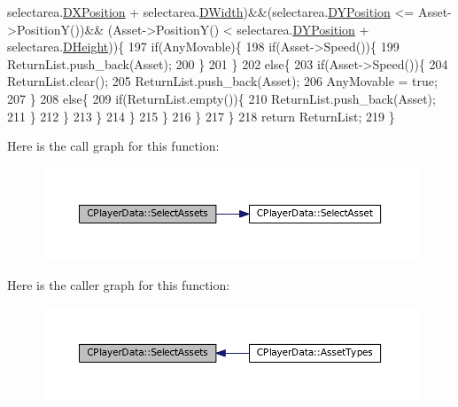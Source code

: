 \begin{DoxyCode}
      selectarea.\hyperlink{structSRectangle_abcbddb03b3ee416cc33109833b5f075c}{DXPosition} + selectarea.\hyperlink{structSRectangle_a4150898b3f7d90f6e4b0d44bf1ae3bd2}{DWidth})&&(selectarea.\hyperlink{structSRectangle_a120aa0a90033bc6e07c36c151a3bbc71}{DYPosition} <= Asset->PositionY())&&
      (Asset->PositionY() < selectarea.\hyperlink{structSRectangle_a120aa0a90033bc6e07c36c151a3bbc71}{DYPosition} + selectarea.\hyperlink{structSRectangle_a84ea3c2314c43cab6186170662188899}{DHeight}))\{
197                     \textcolor{keywordflow}{if}(AnyMovable)\{
198                         \textcolor{keywordflow}{if}(Asset->Speed())\{
199                             ReturnList.push\_back(Asset);
200                         \}
201                     \}
202                     \textcolor{keywordflow}{else}\{
203                         \textcolor{keywordflow}{if}(Asset->Speed())\{
204                             ReturnList.clear();
205                             ReturnList.push\_back(Asset);
206                             AnyMovable = \textcolor{keyword}{true};
207                         \}
208                         \textcolor{keywordflow}{else}\{
209                             \textcolor{keywordflow}{if}(ReturnList.empty())\{
210                                 ReturnList.push\_back(Asset);
211                             \}
212                         \}
213                     \}
214                 \}
215             \}
216         \}
217     \}
218     \textcolor{keywordflow}{return} ReturnList;
219 \}
\end{DoxyCode}
Here is the call graph for this function\+:\nopagebreak
\begin{figure}[H]
\begin{center}
\leavevmode
\includegraphics[width=350pt]{classCPlayerData_afb3303a53687383e4101d4de37391d84_cgraph}
\end{center}
\end{figure}
Here is the caller graph for this function\+:\nopagebreak
\begin{figure}[H]
\begin{center}
\leavevmode
\includegraphics[width=350pt]{classCPlayerData_afb3303a53687383e4101d4de37391d84_icgraph}
\end{center}
\end{figure}
\hypertarget{classCPlayerData_a3ac1393306e8a3f7c95d13ca01e429a7}{}\label{classCPlayerData_a3ac1393306e8a3f7c95d13ca01e429a7} 
